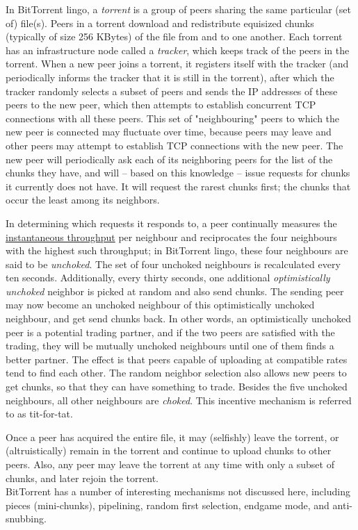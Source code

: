 \documentclass[table, xcdraw]{article}%
\begin{document}
In BitTorrent lingo, a \emph{torrent} is a group of peers sharing the same particular (set of) file(s). Peers in a torrent download and redistribute equisized chunks (typically of size 256 KBytes) of the file from and to one another. Each torrent has an infrastructure node called a \emph{tracker}, which keeps track of the peers in the torrent. When a new peer joins a torrent, it registers itself with the tracker (and periodically informs the tracker that it is still in the torrent), after which the tracker randomly selects a subset of peers and sends the IP addresses of these peers to the new peer, which then attempts to establish concurrent TCP connections with all these peers. This set of "neighbouring" peers to which the new peer is connected may fluctuate over time, because peers may leave and other peers may attempt to establish TCP connections with the new peer. The new peer will periodically ask each of its neighboring peers for the list of the chunks they have, and will -- based on this knowledge -- issue requests for chunks it currently does not have. It will request the rarest chunks first; the chunks that occur the least among its neighbors.

In determining which requests it responds to, a peer continually measures the \hyperref[throughput]{instantaneous throughput} per neighbour and reciprocates the four neighbours with the highest such throughput; in BitTorrent lingo, these four neighbours are said to be \emph{unchoked}. The set of four unchoked neighbours is recalculated every ten seconds. Additionally, every thirty seconds, one additional \emph{optimistically unchoked} neighbor is picked at random and also send chunks. The sending peer may now become an unchoked neighbour of this optimistically unchoked neighbour, and get send chunks back. In other words, an optimistically unchoked peer is a potential trading partner, and if the two peers are satisfied with the trading, they will be mutually unchoked neighbours until one of them finds a better partner. The effect is that peers capable of uploading at compatible rates tend to find each other. The random neighbor selection also allows new peers to get chunks, so that they can have something to trade. Besides the five unchoked neighbours, all other neighbours are \emph{choked}. This incentive mechanism is referred to as tit-for-tat.

Once a peer has acquired the entire file, it may (selfishly) leave the torrent, or (altruistically) remain in the torrent and continue to upload chunks to other peers. Also, any peer may leave the torrent at any time with only a subset of chunks, and later rejoin the torrent.\\
BitTorrent has a number of interesting mechanisms not discussed here, including pieces (mini-chunks), pipelining, random first selection, endgame mode, and anti-snubbing.
\end{document}

